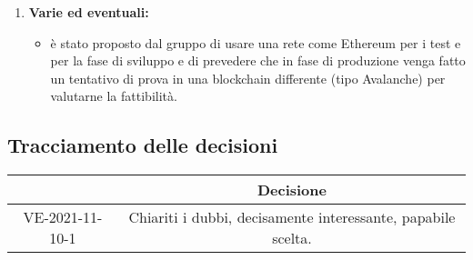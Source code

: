 \begin{enumerate}
	\item \textbf{Varie ed eventuali:}
	\begin{itemize}
		\item è stato proposto dal gruppo di usare una rete come Ethereum\glo{} per i test e per la fase di sviluppo e di prevedere che in fase di produzione venga fatto un tentativo di prova in una blockchain\glo{} differente (tipo Avalanche) per valutarne la fattibilità.
	\end{itemize}

\end{enumerate}

\pagebreak

\subsection{Tracciamento delle decisioni}

\begin{table}[H]
	\centering
	\renewcommand{\arraystretch}{1.8}
	\begin{tabular}{c | c}
		\rowcolor[HTML]{125e28}
		\multicolumn{1}{c}{\color[HTML]{FFFFFF} \textbf{ID}} &
		\multicolumn{1}{c}{\color[HTML]{FFFFFF} \textbf{Decisione}} \\
		\hline
		VE-2021-11-10-1 & Chiariti i dubbi, decisamente interessante, papabile scelta. \\ \hline

	\end{tabular}
\end{table}